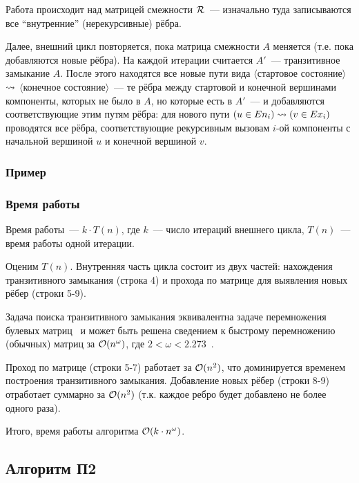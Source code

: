     Работа происходит над матрицей смежности $\mathcal{R}$~--- изначально туда записываются все ``внутренние'' (нерекурсивные) рёбра. 

    Далее, внешний цикл повторяется, пока матрица смежности $A$ меняется (т.е. пока добавляются новые рёбра). На каждой итерации считается $A'$~--- транзитивное замыкание $A$. После этого находятся все новые пути вида $\langle$стартовое состояние$\rangle$ $\rightsquigarrow$ $\langle$конечное состояние$\rangle$~--- те рёбра между стартовой и конечной вершинами компоненты, которых не было в $A$, но которые есть в $A'$~--- и добавляются соответствующие этим путям рёбра: для нового пути $(u \in En_i) \rightsquigarrow (v \in Ex_i)$ проводятся все рёбра, соответствующие рекурсивным вызовам $i$-ой компоненты с начальной вершиной $u$ и конечной вершиной $v$.

\subsubsection{Пример}

\TODO

\subsubsection{Время работы}

    Время работы~--- $k \cdot T(n)$, где $k$~--- число итераций внешнего цикла, $T(n)$~--- время работы одной итерации. 

    Оценим $T(n)$. Внутренняя часть цикла состоит из двух частей: нахождения транзитивного замыкания (строка 4) и прохода по матрице для выявления новых рёбер (строки 5-9). 

    Задача поиска транзитивного замыкания эквивалентна задаче перемножения булевых матриц~\cite{Aho1974} и может быть решена сведением к быстрому перемножению (обычных) матриц за $\mathcal{O}(n^\omega)$, где $2 < \omega < 2.273$~\cite{Alman20}.

    Проход по матрице (строки 5-7) работает за $\mathcal{O}(n^2)$, что доминируется временем построения транзитивного замыкания. Добавление новых рёбер (строки 8-9) отработает суммарно за $\mathcal{O}(n^2)$ (т.к. каждое ребро будет добавлено не более одного раза).

    Итого, время работы алгоритма $\mathcal{O}(k \cdot n^{\omega})$.

\subsection{Алгоритм П2}

